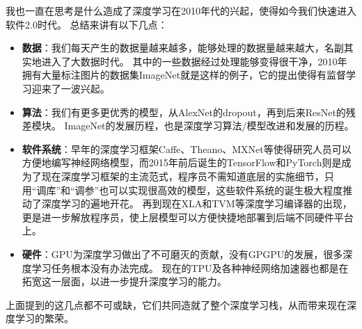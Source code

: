 \bigskip
\begin{tcolorbox}
我也一直在思考是什么造成了深度学习在2010年代的兴起，使得如今我们快速进入软件2.0时代\cite{olukotun:software2_2018}。
总结来讲有以下几点：
\begin{itemize}
    \item \textbf{数据}：我们每天产生的数据量越来越多，能够处理的数据量越来越大，名副其实地进入了大数据时代。
    其中的一些数据经过处理能够变得很干净，2010年拥有大量标注图片的数据集ImageNet就是这样的例子，它的提出使得有监督学习迎来了一波兴起。
    \item \textbf{算法}：我们有更多更优秀的模型，从AlexNet的dropout，再到后来ResNet的残差模块。
    ImageNet的发展历程，也是深度学习算法/模型改进和发展的历程。
    \item \textbf{软件系统}：早年的深度学习框架Caffe、Theano、MXNet等使得研究人员可以方便地编写神经网络模型，而2015年前后诞生的TensorFlow和PyTorch则是成为了现在深度学习框架的主流范式，程序员不需知道底层的实施细节，只用“调库”和“调参”也可以实现很高效的模型，这些软件系统的诞生极大程度推动了深度学习的遍地开花。
    再到现在XLA和TVM等深度学习编译器的出现，更是进一步解放程序员，使上层模型可以方便快捷地部署到后端不同硬件平台上。
    \item \textbf{硬件}：GPU为深度学习做出了不可磨灭的贡献，没有GPGPU的发展，很多深度学习任务根本没有办法完成。
    现在的TPU及各种神经网络加速器也都是在拓宽这一层面，以进一步提升深度学习的能力。
\end{itemize}
上面提到的这几点都不可或缺，它们共同造就了整个深度学习栈，从而带来现在深度学习的繁荣。
\end{tcolorbox}